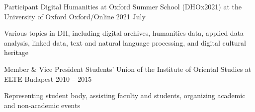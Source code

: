 
\begin{cventries}

  \cventry
    {Participant} %
    {Digital Humanities at Oxford Summer School (DHOx2021) at the University of Oxford} %
    {Oxford/Online} %
    {2021 July} %
    {
      \begin{cvitems} %
        \item {Various topics in DH, including digital archives, humanities data, applied data analysis, linked data, text and natural language processing, and digital cultural heritage}
      \end{cvitems}
    }


  \cventry
    {Member \& Vice President} %
    {Students’ Union of the Institute of Oriental Studies at ELTE} %
    {Budapest} %
    {2010 -- 2015} %
    {
      \begin{cvitems} %
        \item {Representing student body, assisting faculty and students, organizing academic and non-academic events}
      \end{cvitems}
    }
  

\end{cventries}
